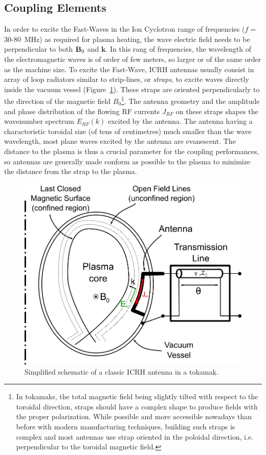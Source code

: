 \subsection{Coupling Elements}
In order to excite the Fast-Waves in the Ion Cyclotron range of frequencies ($f=$30-80~MHz) as required for plasma heating, the wave electric field needs to be perpendicular to both ${\mathbf B}_0$ and $\mathbf{k}$. In this rang of frequencies, the wavelength of the electromagnetic waves is of order of few meters, so larger or of the same order as the machine size. To excite the Fast-Wave, ICRH antennas usually consist in array of loop radiators similar to strip-lines, or \textit{straps}, to excite waves directly inside the vacuum vessel (Figure~\ref{fig:icrhantennasimplified}). These straps are oriented perpendicularly to the direction of the magnetic field $B_0$\footnote{In tokamaks, the total magnetic field being slightly tilted with respect to the toroidal direction, straps should have a complex shape to produce fields with the proper polarization. While possible and more accessible nowadays than before with modern manufacturing techniques, building such straps is complex and most antennas use strap oriented in the poloidal direction, i.e. perpendicular to the toroidal magnetic field.}. The antenna geometry and the amplitude and phase distribution of the flowing RF currents $J_{RF}$ on these straps shapes the wavenumber spectrum $E_{RF}(k)$ excited by the antenna. The antenna having a characteristic toroidal size (of tens of centimetres) much smaller than the wave wavelength, most plane waves excited by the antenna are evanescent. The distance to the plasma is thus a crucial parameter for the coupling performances, so antennas are generally made conform as possible to the plasma to minimize the distance from the strap to the plasma. 

\begin{figure}[h]
	\centering
	\includegraphics[width=0.9\linewidth]{figures/chap3/ICRH_antenna_simplified}
	\caption{Simplified schematic of a classic ICRH antenna in a tokamak.}
	\label{fig:icrhantennasimplified}
\end{figure}



